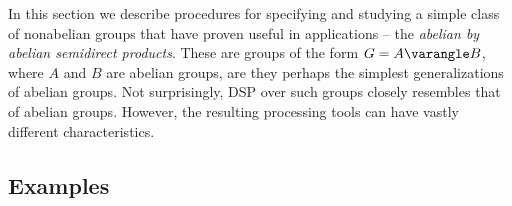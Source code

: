 In this section we describe procedures for specifying and studying a simple
class of nonabelian groups that have proven useful in applications -- the
\emph{abelian by abelian semidirect products}.
These are groups of the form $G = A \varangle B$, where $A$ and $B$ are abelian groups,
are they perhaps the simplest generalizations of abelian groups.  Not surprisingly,
DSP over such groups closely resembles that of abelian groups.  However, the
resulting processing tools can have vastly different characteristics.  


\subsection{Examples}

